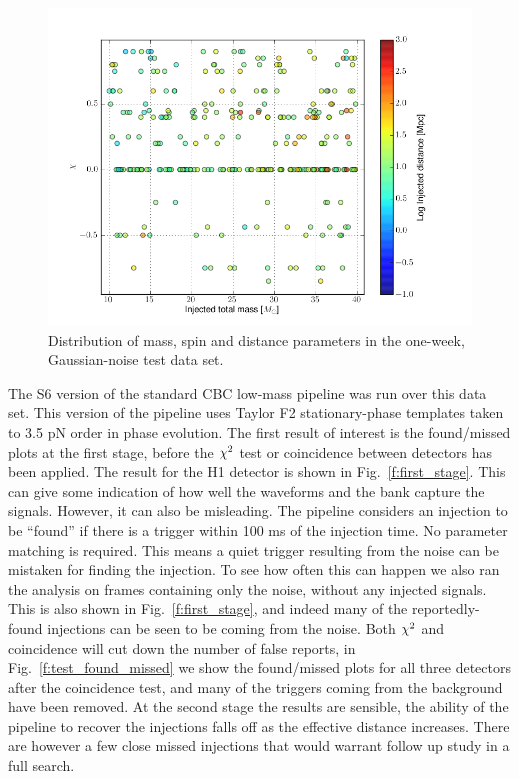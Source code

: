 \begin{figure}
  \includegraphics[width=\linewidth]{figures/ninja2_results/ninja2_test_dataset.png}
  \caption[Parameters of the NINJA-2 test one-week data set]{
  \label{f:ninja2_test_dataset}
Distribution of mass, spin and distance parameters in the one-week,
Gaussian-noise test data set.
}
\end{figure}%


The S6 version of the standard CBC low-mass pipeline was run over this
data set.  This version of the pipeline uses Taylor F2
stationary-phase templates taken to 3.5 pN order in phase evolution.
The first result of interest is the found/missed plots at the first
stage, before the $\chi^2$ test or coincidence between detectors has
been applied.  The result for the H1 detector is shown in
Fig.~\ref{f:first_stage}.  This can give some indication of how well
the waveforms and the bank capture the signals.  However, it can also
be misleading.  The pipeline considers an injection to be ``found'' if
there is a trigger within 100 ms of the injection time.  No parameter
matching is required.  This means a quiet trigger resulting from the
noise can be mistaken for finding the injection.  To see how often
this can happen we also ran the analysis on frames containing only the
noise, without any injected signals.  This is also shown in
Fig.~\ref{f:first_stage}, and indeed many of the reportedly-found
injections can be seen to be coming from the noise.  Both $\chi^2$ and
coincidence will cut down the number of false reports, in
Fig.~\ref{f:test_found_missed} we show the found/missed plots for
all three detectors after the coincidence test, and many of the
triggers coming from the background have been removed.  At the second
stage the results are sensible, the ability of the pipeline to recover
the injections falls off as the effective distance increases.  There
are however a few close missed injections that would warrant follow up
study in a full search.


